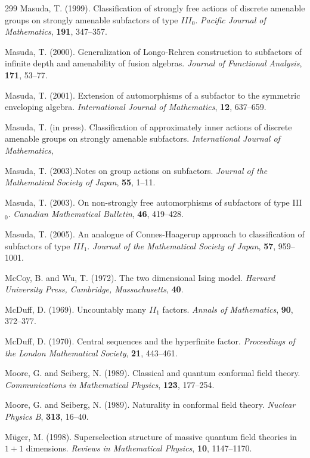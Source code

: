 \documentclass[12pt]{article}
\theoremstyle{plain}
\theoremstyle{definition}
\numberwithin{equation}{section}
\begin{document}
\begin{thebibliography} {299}
Masuda, T. (1999). Classification of strongly free actions of discrete amenable groups on
strongly amenable subfactors of type $III_0$. {\em Pacific Journal of Mathematics},
{\bf 191}, 347--357.

Masuda, T. (2000). Generalization of Longo-Rehren construction to subfactors of
infinite depth and amenability of fusion algebras.
{\em Journal of Functional Analysis}, {\bf 171}, 53--77.

Masuda, T. (2001). Extension of automorphisms of a subfactor to the symmetric
enveloping algebra. {\em International Journal of Mathematics},
{\bf 12}, 637--659.

Masuda, T. (in press). Classification of approximately inner actions of discrete
amenable groups on strongly amenable subfactors.
{\em International Journal of Mathematics},

Masuda, T. (2003).Notes on group actions on subfactors.
{\em Journal of the Mathematical Society of Japan}, {\bf 55}, 1--11.

Masuda, T. (2003). On non-strongly free automorphisms of subfactors of type III$_0$.
{\em Canadian Mathematical Bulletin}, {\bf 46}, 419--428.

Masuda, T. (2005). An analogue of Connes-Haagerup approach to classification of
subfactors of type $III_1$. {\em Journal of the Mathematical Society of Japan}, {\bf 57}, 959--1001.

McCoy, B. and Wu, T. (1972). The two dimensional Ising model.
{\em Harvard University Press, Cambridge, Massachusetts}, {\bf 40}.

McDuff, D. (1969). Uncountably many $II_1$ factors. {\em Annals of Mathematics}, {\bf 90}, 372--377.

McDuff, D. (1970). Central sequences and the hyperfinite factor.
{\em Proceedings of the London Mathematical Society},
{\bf 21}, 443--461.

Moore, G. and Seiberg, N. (1989). Classical and quantum conformal field theory.
{\em Communications in Mathematical Physics},
{\bf 123}, 177--254.

Moore, G. and Seiberg, N. (1989). Naturality in conformal field theory.
{\em Nuclear Physics B}, {\bf 313}, 16--40.

M\"uger, M. (1998). Superselection structure of massive quantum field theories in $1+1$
dimensions. {\em Reviews in Mathematical Physics}, {\bf 10}, 1147--1170.


\end{thebibliography}
\end{document}
